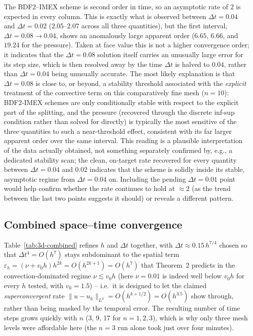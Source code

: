 \documentclass[11pt]{article}
\newcommand{\eps}{\varepsilon}
\begin{document}
The BDF2--IMEX scheme is second order in time, so an asymptotic rate of $2$ is expected
in every column. This is exactly what is observed between $\Delta t=0.04$ and
$\Delta t=0.02$ ($2.05$--$2.07$ across all three quantities), but the first interval,
$\Delta t=0.08\to0.04$, shows an anomalously large apparent order ($6.65$, $6.66$, and
$19.24$ for the pressure). Taken at face value this is not a higher convergence order; it
indicates that the $\Delta t=0.08$ solution itself carries an unusually large error for
its step size, which is then resolved away by the time $\Delta t$ is halved to $0.04$,
rather than $\Delta t=0.04$ being unusually accurate. The most likely explanation is that
$\Delta t=0.08$ is close to, or beyond, a stability threshold associated with the
\emph{explicit} treatment of the convective term on this comparatively fine mesh
($n=10$): BDF2-IMEX schemes are only conditionally stable with respect to the explicit
part of the splitting, and the pressure (recovered through the discrete inf-sup
condition rather than solved for directly) is typically the most sensitive of the three
quantities to such a near-threshold effect, consistent with its far larger apparent order
over the same interval. This reading is a plausible interpretation of the data actually
obtained, not something separately confirmed by, e.g., a dedicated stability scan; the
clean, on-target rate recovered for every quantity between $\Delta t=0.04$ and $0.02$
indicates that the scheme is solidly inside its stable, asymptotic regime from
$\Delta t=0.04$ on. Including the pending $\Delta t=0.01$ point would help confirm
whether the rate continues to hold at $\approx2$ (as the trend between the last two points
suggests it should) or reveals a different pattern.

\subsection{Combined space--time convergence}
\label{sec:3d-combined}

Table~\ref{tab:3d-combined} refines $h$ and $\Delta t$ together, with
$\Delta t\approx0.15\,h^{7/4}$ chosen so that $\Delta t^4=O(h^7)$ stays subdominant to the
spatial term $\eps_h=(\nu+v_0h)h^{2k}=O(h^{2k+1})=O(h^7)$ that Theorem~2 predicts in the
convection-dominated regime $\nu\lesssim v_0h$ (here $\nu=0.01$ is indeed well below
$v_0h$ for every $h$ tested, with $v_0=1.5$) -- i.e.\ it is designed to let the claimed
\emph{superconvergent} rate $\|u-u_h\|_{L^2}=O(h^{k+1/2})=O(h^{3.5})$ show through, rather
than being masked by the temporal error. The resulting number of time steps grows quickly
with $n$ (3, 9, 17 for $n=1,2,3$), which is why only three mesh levels were affordable
here (the $n=3$ run alone took just over four minutes).
\end{document}
